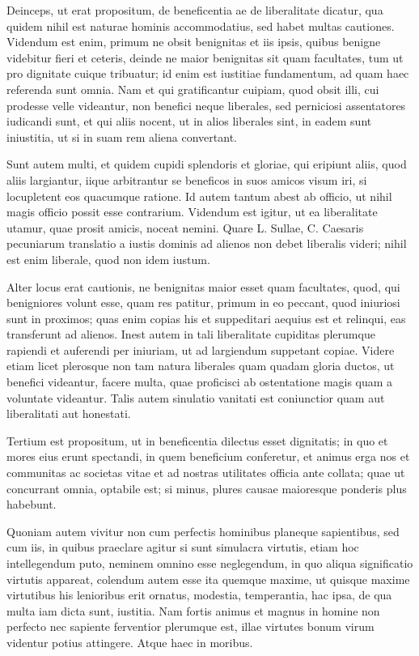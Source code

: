  Deinceps, ut erat propositum, de beneficentia ae de liberalitate dicatur, qua quidem nihil est naturae hominis accommodatius, sed habet multas cautiones. Videndum est enim, primum ne obsit benignitas et iis ipsis, quibus benigne videbitur fieri et ceteris, deinde ne maior benignitas sit quam facultates, tum ut pro dignitate cuique tribuatur; id enim est iustitiae fundamentum, ad quam haec referenda sunt omnia. Nam et qui gratificantur cuipiam, quod obsit illi, cui prodesse velle videantur, non benefici neque liberales, sed perniciosi assentatores iudicandi sunt, et qui aliis nocent, ut in alios liberales sint, in eadem sunt iniustitia, ut si in suam rem aliena convertant.

 Sunt autem multi, et quidem cupidi splendoris et gloriae, qui eripiunt aliis, quod aliis largiantur, iique arbitrantur se beneficos in suos amicos visum iri, si locupletent eos quacumque ratione. Id autem tantum abest ab officio, ut nihil magis officio possit esse contrarium. Videndum est igitur, ut ea liberalitate utamur, quae prosit amicis, noceat nemini. Quare L. Sullae, C. Caesaris pecuniarum translatio a iustis dominis ad alienos non debet liberalis videri; nihil est enim liberale, quod non idem iustum.

 Alter locus erat cautionis, ne benignitas maior esset quam facultates, quod, qui benigniores volunt esse, quam res patitur, primum in eo peccant, quod iniuriosi sunt in proximos; quas enim copias his et suppeditari aequius est et relinqui, eas transferunt ad alienos. Inest autem in tali liberalitate cupiditas plerumque rapiendi et auferendi per iniuriam, ut ad largiendum suppetant copiae. Videre etiam licet plerosque non tam natura liberales quam quadam gloria ductos, ut benefici videantur, facere multa, quae proficisci ab ostentatione magis quam a voluntate videantur. Talis autem sinulatio vanitati est coniunctior quam aut liberalitati aut honestati.

 Tertium est propositum, ut in beneficentia dilectus esset dignitatis; in quo et mores eius erunt spectandi, in quem beneficium conferetur, et animus erga nos et communitas ac societas vitae et ad nostras utilitates officia ante collata; quae ut concurrant omnia, optabile est; si minus, plures causae maioresque ponderis plus habebunt.

 Quoniam autem vivitur non cum perfectis hominibus planeque sapientibus, sed cum iis, in quibus praeclare agitur si sunt simulacra virtutis, etiam hoc intellegendum puto, neminem omnino esse neglegendum, in quo aliqua significatio virtutis appareat, colendum autem esse ita quemque maxime, ut quisque maxime virtutibus his lenioribus erit ornatus, modestia, temperantia, hac ipsa, de qua multa iam dicta sunt, iustitia. Nam fortis animus et magnus in homine non perfecto nec sapiente ferventior plerumque est, illae virtutes bonum virum videntur potius attingere. Atque haec in moribus.

